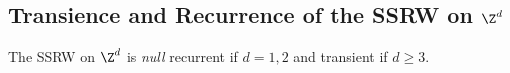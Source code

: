 \subsection{Transience and Recurrence of the SSRW on $\Z^d$} \label{sec:z^d}
\begin{theorem*}
    The SSRW on $\Z^d$ is \emph{null} recurrent if $d = 1, 2$
    and transient if $d \ge 3$.
\end{theorem*}
